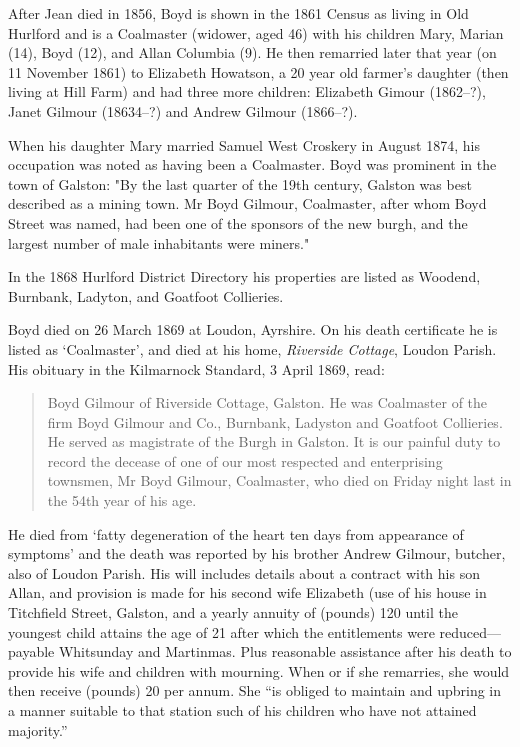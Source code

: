 After Jean died in 1856, Boyd is shown in the 1861 Census as living in Old Hurlford and is a Coalmaster (widower, aged 46) with his children Mary, Marian (14), Boyd (12), and Allan Columbia (9). He then remarried later that year (on 11 November 1861) to Elizabeth Howatson, a 20 year old farmer's daughter (then living at Hill Farm) and had three more children: Elizabeth Gimour (1862--?), Janet Gilmour (18634--?) and Andrew Gilmour (1866--?).

When his daughter Mary married Samuel West Croskery in August 1874,  his occupation was noted as having been a Coalmaster.\cite{SMWCmarriage}  Boyd was prominent in the town of Galston: "By the last quarter of the 19th century, Galston was best described as a mining town. Mr Boyd Gilmour, Coalmaster, after whom Boyd Street was named, had been one of the sponsors of the new burgh, and the largest number of male inhabitants were miners." 

In the 1868 Hurlford District Directory his properties are listed as Woodend, Burnbank, Ladyton, and Goatfoot Collieries.

Boyd died on 26 March 1869 at Loudon, Ayrshire. \cite{BGilmourDeath} On his death certificate he is listed as `Coalmaster', and died at his home, \emph{Riverside Cottage}, Loudon Parish. His obituary in the Kilmarnock Standard, 3 April 1869, read:\cite{BGobituary}

\begin{quotation}
Boyd Gilmour of Riverside Cottage, Galston. He was Coalmaster of the firm Boyd Gilmour and Co., Burnbank, Ladyston and Goatfoot Collieries. He served as magistrate of the Burgh in Galston. It is our painful duty to record the decease of one of our most respected and enterprising townsmen, Mr Boyd Gilmour, Coalmaster, who died on Friday night last in the 54th year of his age.
\end{quotation}

He died from `fatty degeneration of the heart ten days from appearance of symptoms' and the death was reported by his brother Andrew Gilmour, butcher, also of Loudon Parish. His will includes details about a contract with his son Allan, and provision is made for his second wife Elizabeth (use of his house in Titchfield Street, Galston, and a yearly annuity of (pounds) 120 until the youngest child attains the age of 21 after which the entitlements were reduced---payable Whitsunday and Martinmas. Plus reasonable assistance after his death to provide his wife and children with mourning. When or if she remarries, she would then receive (pounds) 20 per annum. She ``is obliged to maintain and upbring in a manner suitable to that station such of his children who have not attained majority.''

